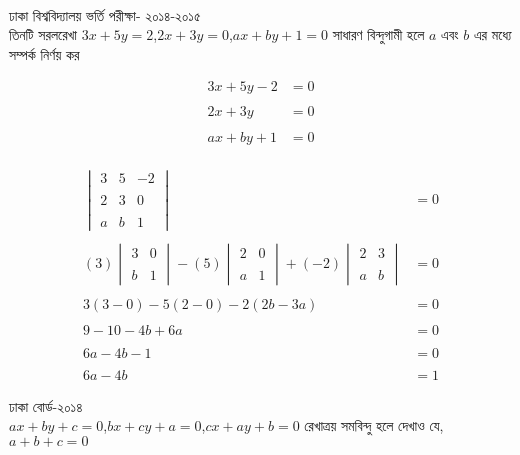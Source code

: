 \documentclass{article}
\begin{document}
	\\
	ঢাকা বিশ্ববিদ্যালয় ভর্তি পরীক্ষা- ২০১৪-২০১৫\\ 
	তিনটি সরলরেখা $3x+5y=2$,\quad $2x+3y=0$,\quad $ax+by+1=0$ সাধারণ বিন্দুগামী হলে  $a$ এবং  $b$ এর মধ্যে সম্পর্ক নির্ণয় কর \\ 
	\begin{multicols}{2}
		\begin{align*}
			3x+5y-2&=0\\
			\\
			2x+3y&=0\\
			\\
			ax+by+1&=0
		\end{align*}
		\\ 
		\begin{align*}
			\begin{vmatrix}
				3& 5&-2\\
				\\
				2 & 3 &0\\
				\\
				a& b &1
			\end{vmatrix}&=0\\
			\\
			(3)	\begin{vmatrix}
				3 &0\\
				\\
				b &1
			\end{vmatrix}-(5)	\begin{vmatrix}
				2 &0\\
				\\
				a &1
			\end{vmatrix}+(-2)	\begin{vmatrix}
				2 &3\\
				\\
				a &b
			\end{vmatrix}&=0\\
			\\
			3(3-0)-5(2-0)-2(2b-3a)&=0\\
			\\
			9-10-4b+6a&=0\\
			\\
			6a-4b-1&=0\\
			\\
			6a-4b&=1
		\end{align*}
	\end{multicols}
	ঢাকা বোর্ড-২০১৪\\ 
	$ax+by+c=0$,\quad$bx+cy+a=0$,\quad $cx+ay+b=0$ রেখাত্রয় সমবিন্দু হলে দেখাও যে,  $a+b+c=0$\\ 
\end{document}
